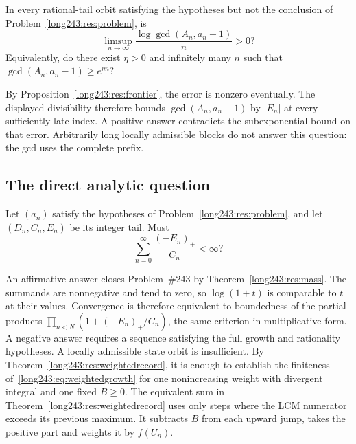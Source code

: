 \documentclass[11pt]{article}
\begin{document}
\begin{problem}\label{long243:res:prefixgcd}
In every rational-tail orbit satisfying the hypotheses but not the conclusion of Problem~\ref{long243:res:problem}, is
\[
 \limsup_{n\to\infty}
 \frac{\log\gcd(A_n,a_n-1)}{n}>0?
\]
Equivalently, do there exist $\eta>0$ and infinitely many $n$ such that
$\gcd(A_n,a_n-1)\ge e^{\eta n}$?
\end{problem}

\noindent By Proposition~\ref{long243:res:frontier}, the error is nonzero
eventually. The displayed divisibility therefore bounds
$\gcd(A_n,a_n-1)$ by $|E_n|$ at every sufficiently late index.
A positive answer contradicts the subexponential bound on that error.
Arbitrarily long locally admissible blocks do
not answer this question: the gcd uses the complete prefix.

\subsection{The direct analytic question}

\begin{problem}\label{long243:res:masshyp}
Let $(a_n)$ satisfy the hypotheses of Problem~\ref{long243:res:problem},
and let $(D_n,C_n,E_n)$ be its integer tail. Must
\[
 \sum_{n=0}^{\infty}\frac{(-E_n)_+}{C_n}<\infty ?
\]
\end{problem}

\noindent An affirmative answer closes Problem~\#243 by
Theorem~\ref{long243:res:mass}. The summands are nonnegative and tend to
zero, so $\log(1+t)$ is comparable to $t$ at their values. Convergence
is therefore equivalent to boundedness of the partial products
$\prod_{n<N}(1+(-E_n)_+/C_n)$, the same criterion in multiplicative form.
A negative answer requires a sequence satisfying the full growth and
rationality hypotheses. A locally admissible state orbit is insufficient.
By Theorem~\ref{long243:res:weightedrecord}, it is enough to establish the
finiteness of~\eqref{long243:eq:weightedgrowth} for one nonincreasing weight
with divergent integral and one fixed $B\ge0$. The equivalent sum in
Theorem~\ref{long243:res:weightedrecord} uses only steps where the LCM
numerator exceeds its previous maximum. It subtracts $B$ from each upward
jump, takes the positive part and weights it by $f(U_n)$.
\end{document}

